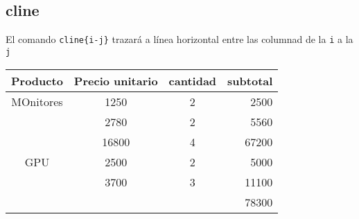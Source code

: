 \documentclass[]{article}
\begin{document}
\begin{itemize}
\subsection {cline}
El comando \verb*|cline{i-j}| trazará a línea horizontal entre las columnad de la \verb*|i| a la  \verb*|j|
\begin{center}
	\begin{tabular}[]{cccr}
		\hline 
		Producto & Precio unitario &cantidad &subtotal \\
		\hline	
		MOnitores & 1250 & 2 & 2500 \\
		          & 2780 & 2 & 5560 \\
		          & 16800 & 4 & 67200 \\
		 \hline
		 GPU      & 2500 & 2 & 5000 \\
		          & 3700 & 3 & 11100 \\
		          \cline{4-4}   %
		          &      &   & 78300
		
	\end{tabular}

\end{center}

	\end{itemize}

	
	
	
\end{document}
